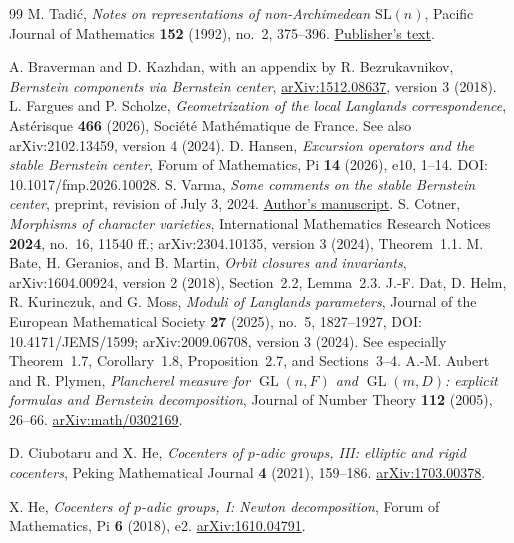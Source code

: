 \documentclass[11pt,a4paper]{amsart}
\theoremstyle{definition}
\theoremstyle{remark}
\DeclareMathOperator{\GL}{GL}
\begin{document}
\clearpage
\begin{thebibliography}{99}
M. Tadi\'c, \emph{Notes on representations of non-Archimedean
$\mathrm{SL}(n)$}, Pacific Journal of Mathematics \textbf{152}
(1992), no.~2, 375--396.
\href{https://msp.org/pjm/1992/152-2/pjm-v152-n2-p11-s.pdf}{Publisher's text}.

A. Braverman and D. Kazhdan, with an appendix by R. Bezrukavnikov,
\emph{Bernstein components via Bernstein center},
\href{https://arxiv.org/abs/1512.08637}{arXiv:1512.08637},
version 3 (2018).
L. Fargues and P. Scholze, \emph{Geometrization of the local Langlands correspondence}, Ast\'erisque \textbf{466} (2026), Soci\'et\'e Math\'ematique de France. See also arXiv:2102.13459, version 4 (2024).
D. Hansen, \emph{Excursion operators and the stable Bernstein center}, Forum of Mathematics, Pi \textbf{14} (2026), e10, 1--14. DOI: 10.1017/fmp.2026.10028.
S. Varma, \emph{Some comments on the stable Bernstein center},
preprint, revision of July 3, 2024.
\href{https://mathweb.tifr.res.in/~sandeepv/stable_center_classical_groups_revision_July_3_2024.pdf}{Author's manuscript}.
S. Cotner, \emph{Morphisms of character varieties}, International Mathematics Research Notices \textbf{2024}, no.~16, 11540 ff.; arXiv:2304.10135, version 3 (2024), Theorem~1.1.
M. Bate, H. Geranios, and B. Martin, \emph{Orbit closures and invariants}, arXiv:1604.00924, version 2 (2018), Section~2.2, Lemma~2.3.
J.-F. Dat, D. Helm, R. Kurinczuk, and G. Moss, \emph{Moduli of Langlands parameters}, Journal of the European Mathematical Society \textbf{27} (2025), no.~5, 1827--1927, DOI: 10.4171/JEMS/1599; arXiv:2009.06708, version 3 (2024).
See especially Theorem~1.7, Corollary~1.8, Proposition~2.7,
and Sections~3--4.
A.-M. Aubert and R. Plymen,
\emph{Plancherel measure for $\GL(n,F)$ and $\GL(m,D)$:
explicit formulas and Bernstein decomposition},
Journal of Number Theory \textbf{112} (2005), 26--66.
\href{https://arxiv.org/abs/math/0302169}{arXiv:math/0302169}.

D. Ciubotaru and X. He,
\emph{Cocenters of $p$-adic groups, III: elliptic and rigid cocenters},
Peking Mathematical Journal \textbf{4} (2021), 159--186.
\href{https://arxiv.org/abs/1703.00378}{arXiv:1703.00378}.

X. He,
\emph{Cocenters of $p$-adic groups, I: Newton decomposition},
Forum of Mathematics, Pi \textbf{6} (2018), e2.
\href{https://arxiv.org/abs/1610.04791}{arXiv:1610.04791}.


\end{thebibliography}
\end{document}
